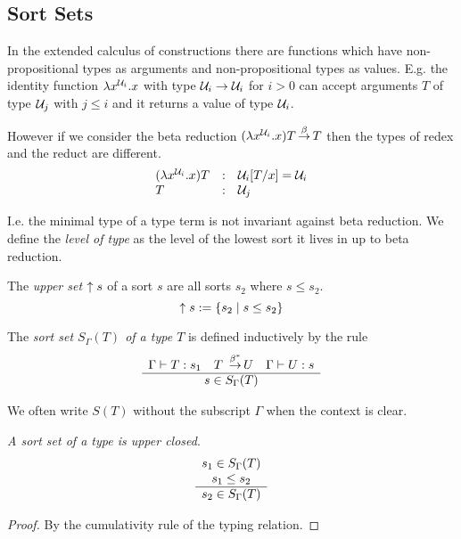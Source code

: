 \subsection{Sort Sets}

In the extended calculus of constructions there are functions which have
non-propositional types as arguments and non-propositional types as values. E.g.
the identity function $\lambda x^{{\cal U}_i}. x$ with type ${\cal U}_i \to {\cal U}_i$ for
$i > 0$ can accept arguments $T$ of type ${\cal U}_j$ with $j \le i$ and it returns
a value of type ${\cal U}_i$.

However if we consider the beta reduction $(\lambda x^{{\cal U}_i}. x) T {\,\stackrel{\beta}{\to}\,} T$
then the types of redex and the reduct are different.
$$
\begin{array}{lll}
    (\lambda x^{{\cal U}_i}. x) T & : & {\cal U}_i[T/x] = {\cal U}_i
    \\
    T & : & {\cal U}_j
\end{array}
$$

I.e. the minimal type of a type term is not invariant against beta reduction. We
define the \emph{level of type} as the level of the lowest sort it lives in up
to beta reduction.



\begin{definition}
    \label{def:UpperSet}
    The \emph{upper set} ${\uparrow s}$ of a sort $s$ are all sorts
    $s_2$ where $s \le s_2$.
    $$
    {\uparrow s} := {\left\{s_2 \mid s \le s_2\right\}}
    $$
\end{definition}




\begin{definition}
    \label{def:SortSet}
    The \emph{sort set $S_\Gamma(T)$ of a type $T$} is defined inductively by
    the rule
    $$
    \ruleh{
        \Gamma \vdash T : s_1\quad
        T \reducestar U\quad
        \Gamma \vdash U : s
    }
    {
        s \in S_\Gamma(T)
    }
    $$

    We often write $S(T)$ without the subscript $\Gamma$ when the context is
    clear.
\end{definition}





\begin{theorem}
    \label{thm:SortSetUpperClosed}
    \emph{A sort set of a type is upper closed}.
    $$
        \begin{array}{c} 
            s_1 \in S_\Gamma(T)
            \\
            s_1 \le s_2
         \\ \hline 
            s_2 \in S_\Gamma(T)
        \end{array}
    $$
    \begin{proof}
        By the cumulativity rule of the typing relation.
    \end{proof}
\end{theorem}


